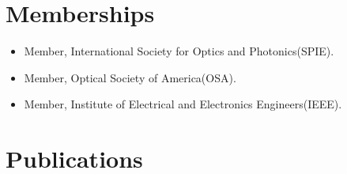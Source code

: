 \documentclass{my_cv}
\begin{document}

\vspace{-5mm} %


\section{{Memberships}} 

\vspace{-2mm} %

\begin{itemize} \itemsep -2pt 
\item Member,  International Society for Optics and Photonics(SPIE).
\item Member, Optical Society of America(OSA). 
\item Member, Institute of Electrical and Electronics Engineers(IEEE). 
\end{itemize}


\vspace{-5mm} %



\section{{Publications}} 
\printbibliography[title={Journal Publications},type=article,heading=subbibliography,resetnumbers=true]
\printbibliography[title={Conference Publications},type=inproceedings,heading=subbibliography,resetnumbers=true]




\let\thefootnote\relax{}
\end{document}
